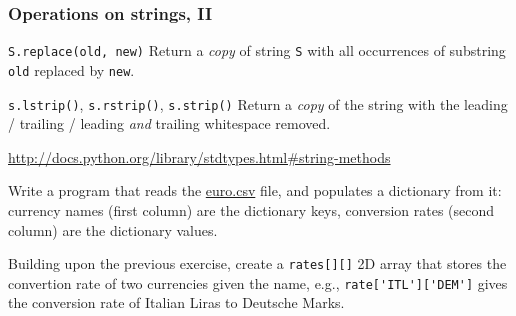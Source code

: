 \documentclass[english,serif,mathserif,xcolor=pdftex,dvipsnames,table]{beamer}
\begin{document}
\begin{frame}[fragile]
  \frametitle{Operations on strings, II}
  \begin{describe}{\lstinline|S.replace(old, new)|}
    Return a \emph{copy} of string \texttt{S} with all occurrences of
    substring \texttt{old} replaced by \texttt{new}.
  \end{describe}
  
  \begin{describe}{%
      \lstinline|s.lstrip()|,
      \lstinline|s.rstrip()|, 
      \lstinline|s.strip()|}
    Return a \emph{copy} of the string with the leading / trailing /
    leading \emph{and} trailing whitespace removed.
  \end{describe}
  
  \begin{references}
    \url{http://docs.python.org/library/stdtypes.html#string-methods}
  \end{references}
\end{frame}


\begin{frame}[fragile]
  \begin{exercise}
    Write a program that reads the \href{http://www.gc3.uzh.ch/euro.csv}{euro.csv} file, and populates a dictionary from it: currency names (first column) are the dictionary keys, conversion rates (second column) are the dictionary values.
  \end{exercise}

  \+
\begin{exercise}
  Building upon the previous exercise, create a \lstinline|rates[][]|
  2D array that stores the convertion rate of two currencies given the
  name, e.g., \lstinline|rate['ITL']['DEM']| gives the conversion rate
  of Italian Liras to Deutsche Marks.
  \end{exercise}
\end{frame}
\end{document}
